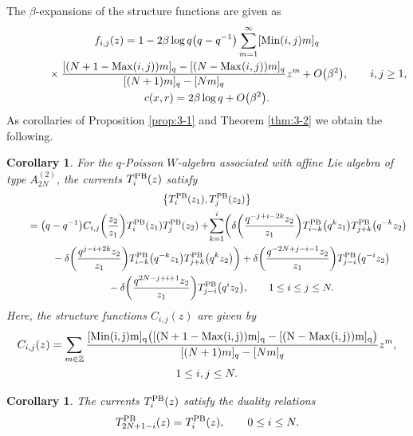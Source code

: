 \documentclass[pdftex]{sigma}
\numberwithin{equation}{section}
\newtheorem{Corollary}[Theorem]{Corollary}
\begin{document}
The $\beta$-expansions of the structure functions are given as
\begin{gather*}
f_{i,j}(z)=1-2 \beta \log q \big(q-q^{-1}\big)\sum_{m=1}^\infty
[\operatorname{Min}(i,j)m ]_q
\\ \hphantom{f_{i,j}(z)=}
{}\times\frac{[(N+1-\operatorname{Max}(i,j))m]_q-[(N-\operatorname{Max}(i,j))m]_q}
{[(N+1)m]_q-[Nm]_q}z^m+O\big(\beta^2\big),\qquad i, j \geq 1,
\\
c(x,r)=2 \beta \log q+O\big(\beta^2\big).
\end{gather*}
As corollaries of Proposition \ref{prop:3-1} and Theorem \ref{thm:3-2}
we obtain the following.

\begin{Corollary}
For the $q$-Poisson $W$-algebra associated with affine Lie algebra
of type $A_{2N}^{(2)}$, the currents $T_i^{\rm PB}(z)$ satisfy
\begin{gather}
\big\{T_i^{\rm PB}(z_1),T_j^{\rm PB}(z_2)\big\}\notag
\\ \qquad
{}=\big(q-q^{-1}\big)C_{i,j}\bigg(\frac{z_2}{z_1}\bigg)T_i^{\rm PB}(z_1)T_j^{\rm PB}(z_2)\notag
+\!\sum_{k=1}^i\!\bigg(\delta\bigg(\frac{q^{-j+i-2k}z_2}{z_1}\bigg)
T_{i-k}^{\rm PB}\big(q^{k}z_1\big)T_{j+k}^{\rm PB}\big(q^{-k}z_2\big)
\\ \qquad\hphantom{=}
{}-\delta\bigg(\frac{q^{j-i+2k}z_2}{z_1}\bigg)
T_{i-k}^{\rm PB}\big(q^{-k}z_1\big)T_{j+k}^{\rm PB}\big(q^{k}z_2\big)\bigg)\notag
+\delta\bigg(\frac{q^{-2N+j-i-1}z_2}{z_1}\bigg)
T_{j-i}^{\rm PB}\big(q^{-i}z_2\big)
\\ \qquad\hphantom{=}
{}-\delta\bigg(\frac{q^{2N-j+i+1}z_2}{z_1}\bigg) T_{j-i}^{\rm PB}\big(q^{i}z_2\big),\qquad
1\leq i \leq j \leq N.
\label{def:q-Poisson}
\end{gather}
Here, the structure functions $C_{i,j}(z)$ are given by
\begin{gather*}
C_{i,j}(z)=\sum_{m \in \mathbb{Z}}\frac{[\rm Min(i,j)m]_q
\bigl([(N+1-\operatorname{Max}(i,j))m]_q-[(N-\operatorname{Max}(i,j))m]_q\bigr)}
{[(N+1)m]_q-[Nm]_q}z^m,
\\
1\leq i,j \leq N.
\end{gather*}
\end{Corollary}

\begin{Corollary}
The currents $T_i^{\rm PB}(z)$ satisfy the duality relations
\begin{gather}
T_{2N+1-i}^{\rm PB}(z)=T_i^{\rm PB}(z),\qquad 0\leq i \leq N.
\label{def:q-Poisson2}
\end{gather}
\end{Corollary}
\end{document}
